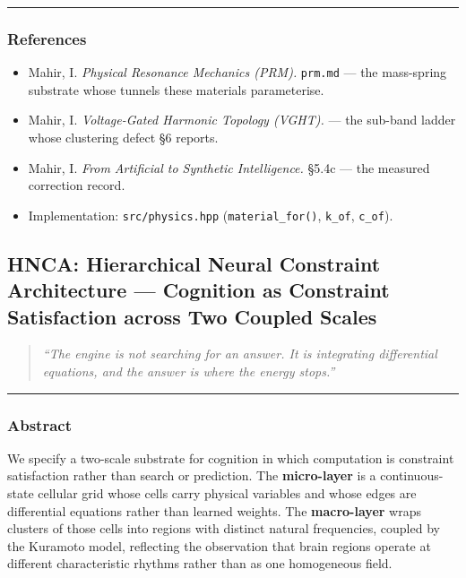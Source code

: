 \documentclass[
  11pt,
  a4paper,
]{article}
\providecommand{\tightlist}{%
  \setlength{\itemsep}{0pt}\setlength{\parskip}{0pt}}
\begin{document}
\begin{center}\rule{0.5\linewidth}{0.5pt}\end{center}

\subsubsection{References}\label{references-2}

\begin{itemize}
\tightlist
\item
  Mahir, I. \emph{Physical Resonance Mechanics (PRM).} \texttt{prm.md}
  --- the mass-spring substrate whose tunnels these materials
  parameterise.
\item
  Mahir, I. \emph{Voltage-Gated Harmonic Topology (VGHT).} --- the
  sub-band ladder whose clustering defect §6 reports.
\item
  Mahir, I. \emph{From Artificial to Synthetic Intelligence.} §5.4c ---
  the measured correction record.
\item
  Implementation: \texttt{src/physics.hpp} (\texttt{material\_for()},
  \texttt{k\_of}, \texttt{c\_of}).
\end{itemize}

\newpage

\subsection{HNCA: Hierarchical Neural Constraint Architecture ---
Cognition as Constraint Satisfaction across Two Coupled
Scales}\label{hnca-hierarchical-neural-constraint-architecture-cognition-as-constraint-satisfaction-across-two-coupled-scales}

\begin{quote}
\emph{``The engine is not searching for an answer. It is integrating
differential equations, and the answer is where the energy stops.''}
\end{quote}

\begin{center}\rule{0.5\linewidth}{0.5pt}\end{center}

\subsubsection{Abstract}\label{abstract-3}

We specify a two-scale substrate for cognition in which computation is
constraint satisfaction rather than search or prediction. The
\textbf{micro-layer} is a continuous-state cellular grid whose cells
carry physical variables and whose edges are differential equations
rather than learned weights. The \textbf{macro-layer} wraps clusters of
those cells into regions with distinct natural frequencies, coupled by
the Kuramoto model, reflecting the observation that brain regions
operate at different characteristic rhythms rather than as one
homogeneous field.
\end{document}
